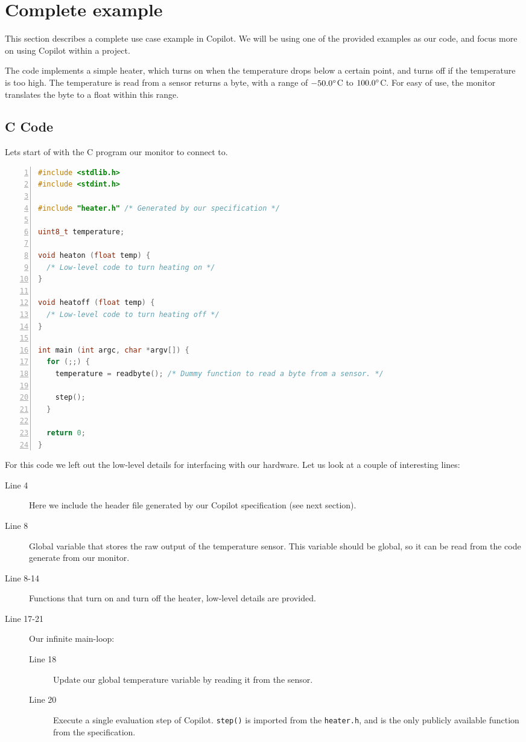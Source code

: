 \section{Complete example}
\label{sec:complete_example}
This section describes a complete use case example in Copilot. We will be using
one of the provided examples as our code, and focus more on using Copilot
within a project.

The code implements a simple heater, which turns on when the temperature drops
below a certain point, and turns off if the temperature is too high. The
temperature is read from a sensor returns a byte, with a range of
$-50.0\degree$C to $100.0\degree$C. For easy of use, the monitor translates the
byte to a float within this range.

\subsection{C Code}
Lets start of with the C program our monitor to connect to.
\begin{lstlisting}[language=c, numbers=left]
#include <stdlib.h>
#include <stdint.h>

#include "heater.h" /* Generated by our specification */

uint8_t temperature;

void heaton (float temp) {
  /* Low-level code to turn heating on */
}

void heatoff (float temp) {
  /* Low-level code to turn heating off */
}

int main (int argc, char *argv[]) {
  for (;;) {
    temperature = readbyte(); /* Dummy function to read a byte from a sensor. */

    step();
  }

  return 0;
}
\end{lstlisting}

For this code we left out the low-level details for interfacing with our
hardware. Let us look at a couple of interesting lines:

\begin{description}
  \item[Line 4] Here we include the header file generated by our Copilot
  specification (see next section).
  \item[Line 8] Global variable that stores the raw output of the temperature
  sensor. This variable should be global, so it can be read from the code
  generate from our monitor.
  \item[Line 8-14] Functions that turn on and turn off the
  heater, low-level details are provided.
  \item[Line 17-21] Our infinite main-loop:
    \begin{description}
      \item[Line 18] Update our global temperature variable by reading it from
      the sensor.
      \item[Line 20] Execute a single evaluation step of Copilot.
      \texttt{step()} is imported from the \texttt{heater.h}, and is the only
      publicly available function from the specification.
    \end{description}
\end{description}

